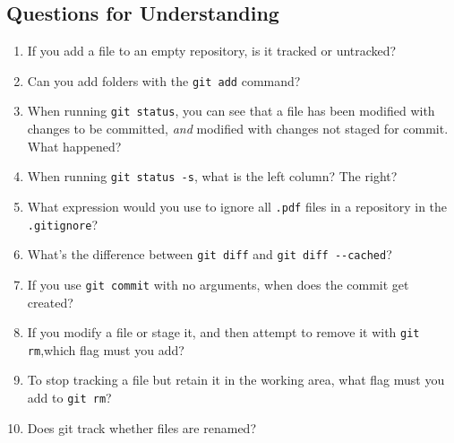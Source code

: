 \subsection{Questions for Understanding}
\begin{enumerate}
    \item If you add a file to an empty repository, is it tracked or
        untracked?
    \item Can you add folders with the \verb+git add+ command?
    \item When running \verb+git status+, you can see that a file has been
        modified with changes to be committed, \emph{and} modified with
        changes not staged for commit. What happened?
    \item When running \verb+git status -s+, what is the left column? The
        right?
    \item What expression would you use to ignore all \verb+.pdf+ files in a
        repository in the \verb+.gitignore+?
    \item What's the difference between
        \verb+git diff+ and \verb+git diff --cached+?
    \item If you use \verb+git commit+ with no arguments, when does the
        commit get created?
    \item If you modify a file or stage it, and then attempt to remove it
        with \verb+git rm+,which flag must you add?
    \item To stop tracking a file but retain it in the working area, what
        flag must you add to \verb+git rm+?
    \item Does git track whether files are renamed?
\end{enumerate}

